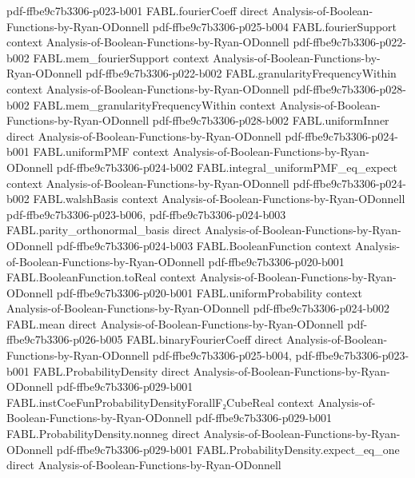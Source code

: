 \begin{theorem}
  {pdf-ffbe9c7b3306-p023-b001}
\proofstep
  {FABL.fourierCoeff}
  {direct}
  {Analysis-of-Boolean-Functions-by-Ryan-ODonnell}
  {pdf-ffbe9c7b3306-p025-b004}
\proofstep
  {FABL.fourierSupport}
  {context}
  {Analysis-of-Boolean-Functions-by-Ryan-ODonnell}
  {pdf-ffbe9c7b3306-p022-b002}
\proofstep
  {FABL.mem_fourierSupport}
  {context}
  {Analysis-of-Boolean-Functions-by-Ryan-ODonnell}
  {pdf-ffbe9c7b3306-p022-b002}
\proofstep
  {FABL.granularityFrequencyWithin}
  {context}
  {Analysis-of-Boolean-Functions-by-Ryan-ODonnell}
  {pdf-ffbe9c7b3306-p028-b002}
\proofstep
  {FABL.mem_granularityFrequencyWithin}
  {context}
  {Analysis-of-Boolean-Functions-by-Ryan-ODonnell}
  {pdf-ffbe9c7b3306-p028-b002}
\proofstep
  {FABL.uniformInner}
  {direct}
  {Analysis-of-Boolean-Functions-by-Ryan-ODonnell}
  {pdf-ffbe9c7b3306-p024-b001}
\proofstep
  {FABL.uniformPMF}
  {context}
  {Analysis-of-Boolean-Functions-by-Ryan-ODonnell}
  {pdf-ffbe9c7b3306-p024-b002}
\proofstep
  {FABL.integral_uniformPMF_eq_expect}
  {context}
  {Analysis-of-Boolean-Functions-by-Ryan-ODonnell}
  {pdf-ffbe9c7b3306-p024-b002}
\proofstep
  {FABL.walshBasis}
  {context}
  {Analysis-of-Boolean-Functions-by-Ryan-ODonnell}
  {pdf-ffbe9c7b3306-p023-b006,
    pdf-ffbe9c7b3306-p024-b003}
\proofstep
  {FABL.parity_orthonormal_basis}
  {direct}
  {Analysis-of-Boolean-Functions-by-Ryan-ODonnell}
  {pdf-ffbe9c7b3306-p024-b003}
\proofstep
  {FABL.BooleanFunction}
  {context}
  {Analysis-of-Boolean-Functions-by-Ryan-ODonnell}
  {pdf-ffbe9c7b3306-p020-b001}
\proofstep
  {FABL.BooleanFunction.toReal}
  {context}
  {Analysis-of-Boolean-Functions-by-Ryan-ODonnell}
  {pdf-ffbe9c7b3306-p020-b001}
\proofstep
  {FABL.uniformProbability}
  {context}
  {Analysis-of-Boolean-Functions-by-Ryan-ODonnell}
  {pdf-ffbe9c7b3306-p024-b002}
\proofstep
  {FABL.mean}
  {direct}
  {Analysis-of-Boolean-Functions-by-Ryan-ODonnell}
  {pdf-ffbe9c7b3306-p026-b005}
\proofstep
  {FABL.binaryFourierCoeff}
  {direct}
  {Analysis-of-Boolean-Functions-by-Ryan-ODonnell}
  {pdf-ffbe9c7b3306-p025-b004,
    pdf-ffbe9c7b3306-p023-b001}
\proofstep
  {FABL.ProbabilityDensity}
  {direct}
  {Analysis-of-Boolean-Functions-by-Ryan-ODonnell}
  {pdf-ffbe9c7b3306-p029-b001}
\proofstep
  {FABL.instCoeFunProbabilityDensityForallF₂CubeReal}
  {context}
  {Analysis-of-Boolean-Functions-by-Ryan-ODonnell}
  {pdf-ffbe9c7b3306-p029-b001}
\proofstep
  {FABL.ProbabilityDensity.nonneg}
  {direct}
  {Analysis-of-Boolean-Functions-by-Ryan-ODonnell}
  {pdf-ffbe9c7b3306-p029-b001}
\proofstep
  {FABL.ProbabilityDensity.expect_eq_one}
  {direct}
  {Analysis-of-Boolean-Functions-by-Ryan-ODonnell}

\end{theorem}
